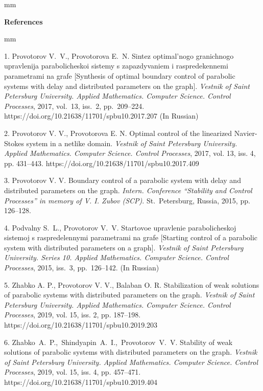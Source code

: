 

{\small



 mm

\noindent \textbf{References} }

 mm

{\footnotesize



1. Provotorov V.~V., Provotorova E.~N. Sintez optimal'nogo granichnogo upravlenija parabolicheskoi sistemy s zapazdyvaniem i raspredekennemi parametrami na grafe [Synthesis of optimal boundary control of parabolic systems with delay and distributed parameters on the graph]. \textit{Vestnik of Saint Petersburg University. Applied Mathematics. Computer Science. Control Processes}, 2017, vol.~13, iss.~2, pp.~209--224. https://doi.org/10.21638/11701/spbu10.2017.207 (In Russian)

2. Provotorov V. V., Provotorova E. N. Optimal control of the linearized Navier-Stokes system in a netlike domain. \emph{Vestnik of Saint Petersburg University.  Applied Mathematics. Computer Science. Control Processes}, 2017, vol. 13, iss. 4, pp. 431--443.
https://doi.org/10.21638/11701/spbu10.2017.409

3. Provotorov V. V. Boundary control of a parabolic system with delay and distributed parameters on the graph. \emph{Intern. Conference ``Stability and Control Processes'' in memory of V. I. Zubov (SCP)}. St.~Petersburg, Russia, 2015, pp. 126--128.

4. Podvalny S.~L., Provotorov V.~V. Startovoe upravlenie parabolicheskoj sistemoj s raspredelennymi parametrami na grafe [Starting control of a parabolic system with distributed
parameters on a graph]. \textit{Vestnik of Saint Petersburg University. Series 10.
Applied Mathematics. Computer Science. Control Processes}, 2015, iss.~3, pp.~126--142. (In Russian)

5. Zhabko A. P.,  Provotorov V. V., Balaban O. R.  Stabilization of weak solutions of parabolic systems with distributed parameters on the graph. \emph{Vestnik of Saint Petersburg University. Applied Mathematics. Computer Science. Control Processes}, 2019, vol. 15, iss. 2, pp. 187--198.\\ https://doi.org/10.21638/11701/spbu10.2019.203

6. Zhabko~A.~P.,~Shindyapin~A.~I.,~Provotorov~V.~V.  Stability of weak solutions of parabolic systems with distributed parameters on the graph. \textit{Vestnik of Saint Petersburg University. Applied Mathematics. Computer Science. Control Processes}, 2019, vol. 15, iss. 4, pp. 457--471.\\ https://doi.org/10.21638/11701/spbu10.2019.404

}
